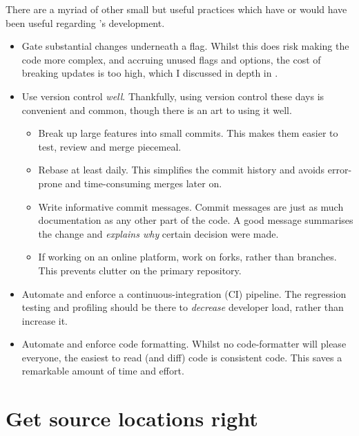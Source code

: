 There are a myriad of other small but useful practices which have or would have
been useful regarding 's development.
\begin{itemize}
    \item Gate substantial changes underneath a flag. Whilst this
        does risk making the code more complex, and accruing unused flags and
        options, the cost of breaking updates is too high, which I discussed in
        depth in .
    \item Use version control \emph{well}. Thankfully, using version control
        these days is convenient and common, though there is an art to
        using it well.
        \begin{itemize}
            \item Break up large features into small commits. This makes them
                easier to test, review and merge piecemeal.
            \item Rebase at least daily. This simplifies the commit history and
                avoids error-prone and time-consuming merges later on.
            \item Write informative commit messages. Commit messages are just
                as much documentation as any other part of the code. A good
                message summarises the change and \emph{explains why}
                certain decision were made.
            \item If working on an online platform, work on forks, rather than
                branches. This prevents clutter on the primary repository.
        \end{itemize}
    \item Automate and enforce a continuous-integration (CI) pipeline. The
        regression testing and profiling should be there to \emph{decrease}
        developer load, rather than increase  it.
    \item Automate and enforce code formatting. Whilst no code-formatter will
        please everyone, the easiest to read (and diff) code is consistent
        code. This saves a remarkable amount of time and effort.
\end{itemize}

\section{Get source locations right}

